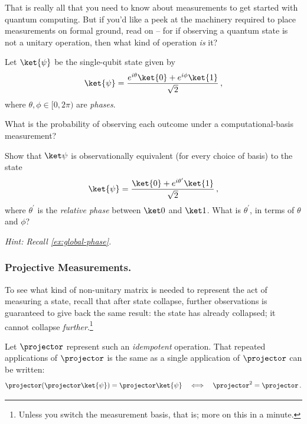       That is really all that you need to know about measurements to get started with
        quantum computing.
        But if you'd like a peek at the machinery required to place measurements
        on formal ground, read on -- for if observing a quantum state is not a
        unitary operation, then what kind of operation \emph{is} it?

      \begin{exercise}
        Let $\ket{\psi}$ be the single-qubit state given by
        \[
          \ket{\psi} = \frac{e^{i \theta}\ket{0} + e^{i \phi}\ket{1}}{\sqrt 2}\, ,
        \] 
        where $\theta, \phi \in [0,2\pi)$ are \emph{phases}.
        \begin{subex}
          \item What is the probability of observing each outcome under a
            computational-basis measurement?
          \item Show that $\ket \psi$ is observationally equivalent
            (for every choice of basis) to the state
            \[
              \ket{\psi} = \frac{\ket{0} + e^{i \theta^\prime}\ket{1}}{\sqrt
              2}\, ,
            \]
            where $\theta^\prime$ is the \emph{relative phase} between $\ket 0$
            and $\ket 1$. 
            What is $\theta^\prime$, in terms of $\theta$ and $\phi$?
        \end{subex}
        \emph{Hint: Recall \cref{ex:global-phase}.}
      \end{exercise}
     
    \subsubsection{Projective Measurements.} 
      To see what kind of non-unitary matrix is needed to represent the act of
        measuring a state, recall that after state collapse, further
        observations is guaranteed to give back the same result:
        the state has already collapsed; it cannot collapse
        \emph{further}.\footnote{
          Unless you switch the measurement basis, that is; more on this in a minute.
        }

      Let $\projector$ represent such an \emph{idempotent} operation. 
        That repeated applications of $\projector$ is the same as a single
        application of $\projector$ can be written:
        \[ 
          \projector (\projector \ket{\psi}) =
          \projector \ket{\psi}
          \quad \Longleftrightarrow \quad 
          \projector^2 = \projector\, .
        \]

